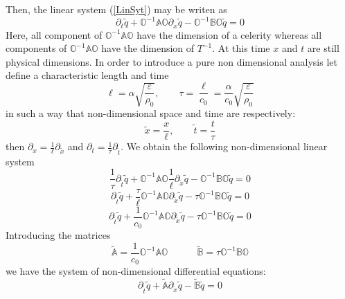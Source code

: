 \documentclass[
10pt, %
a4paper, %
oneside, %
headinclude,footinclude, %
table
]{scrartcl}
\begin{document}
Then, the linear system (\ref{LinSyt}) may be writen as 
\begin{equation}
\partial_{t}\tilde{q}+\mathbb{O}^{-1}\mathbb{A}\mathbb{O}\partial_{x}\tilde{q}-\mathbb{O}^{-1}\mathbb{B}\mathbb{O}\tilde{q}=0
\end{equation}
Here, all component of $\mathbb{O}^{-1}\mathbb{A}\mathbb{O}$ have the dimension of a celerity whereas all components of  $\mathbb{O}^{-1}\mathbb{A}\mathbb{O}$ have the dimension of $T^{-1}$. At this time $x$ and $t$ are still physical dimensions. In order to introduce a pure non dimensional analysis let define a characteristic length and time 
\begin{equation}\label{CharacteristicSize}
\ell=\alpha  \sqrt{\frac{\varepsilon}{\rho_{0}}}, \quad\quad \tau=\frac{\ell}{c_{0}}=\frac{\alpha}{c_{0}}  \sqrt{\frac{\varepsilon}{\rho_{0}}}
\end{equation}
in such a way that non-dimensional space and time are respectively:
\begin{equation}\label{Rescaling}
\tilde{x}=\frac{x}{\ell}, \quad\quad	\tilde{t}=\frac{t}{\tau}
\end{equation}
then $\partial_{x}=\frac{1}{\ell}\partial_{\tilde{x}}$ and $\partial_{t}=\frac{1}{\tau}\partial_{\tilde{t}}$. We obtain the following non-dimensional linear system 
\begin{equation}
\frac{1}{\tau}\partial_{\tilde{t}}\tilde{q}+\mathbb{O}^{-1}\mathbb{A}\mathbb{O}\frac{1}{\ell}\partial_{\tilde{x}}\tilde{q}-\mathbb{O}^{-1}\mathbb{B}\mathbb{O}\tilde{q}=0
\end{equation}
\begin{equation}
\partial_{\tilde{t}}\tilde{q}+\frac{\tau}{\ell}\mathbb{O}^{-1}\mathbb{A}\mathbb{O}\partial_{\tilde{x}}\tilde{q}-\tau \mathbb{O}^{-1}\mathbb{B}\mathbb{O}\tilde{q}=0
\end{equation}
\begin{equation}
\partial_{\tilde{t}}\tilde{q}+\frac{1}{c_{0}}\mathbb{O}^{-1}\mathbb{A}\mathbb{O}\partial_{\tilde{x}}\tilde{q}-\tau \mathbb{O}^{-1}\mathbb{B}\mathbb{O}\tilde{q}=0
\end{equation}
Introducing the matrices
$$
\tilde{\mathbb{A}} = \frac{1}{c_{0}}\mathbb{O}^{-1}\mathbb{A}\mathbb{O}
\quad\quad\quad
\tilde{\mathbb{B}} = \tau\mathbb{O}^{-1}\mathbb{B}\mathbb{O}
$$
we have the system of non-dimensional differential equations:
\begin{equation}\label{SystDiffAdim}
\boxed{\partial_{\tilde{t}}\tilde{q}+\tilde{\mathbb{A}}\partial_{\tilde{x}}\tilde{q}-\tilde{\mathbb{B}}\tilde{q}=0}
\end{equation}
\end{document}
